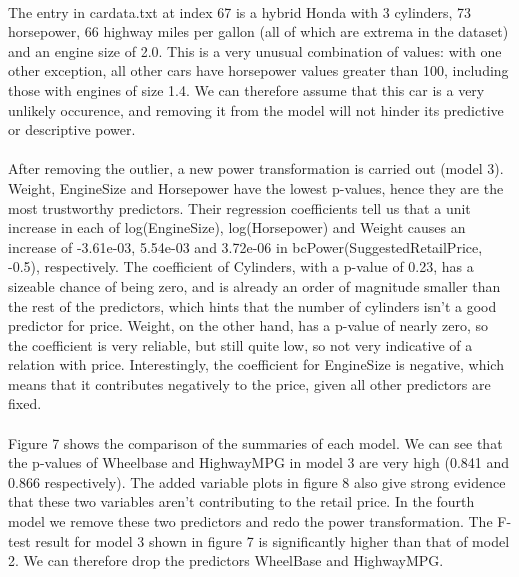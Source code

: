 \documentclass{article}
\begin{document}
\paragraph{}
The entry in cardata.txt at index 67 is a hybrid Honda with 3 cylinders, 73 horsepower, 66 highway miles per gallon (all of which are extrema in the dataset) and an engine size of 2.0. This is a very unusual combination of values: with one other exception, all other cars have horsepower values greater than 100, including those with engines of size 1.4. We can therefore assume that this car is a very unlikely occurence, and removing it from the model will not hinder its predictive or descriptive power.

\paragraph{}
After removing the outlier, a new power transformation is carried out (model 3). Weight, EngineSize and Horsepower have the lowest p-values, hence they are the most trustworthy predictors. Their regression coefficients tell us that a unit increase in each of log(EngineSize), log(Horsepower) and Weight causes an increase of -3.61e-03, 5.54e-03 and 3.72e-06 in bcPower(SuggestedRetailPrice, -0.5), respectively. The coefficient of Cylinders, with a p-value of 0.23, has a sizeable chance of being zero, and is already an order of magnitude smaller than the rest of the predictors, which hints that the number of cylinders isn't a good predictor for price. Weight, on the other hand, has a p-value of nearly zero, so the coefficient is very reliable, but still quite low, so not very indicative of a relation with price. Interestingly, the coefficient for EngineSize is negative, which means that it contributes negatively to the price, given all other predictors are fixed.

\paragraph{}
Figure 7 shows the comparison of the summaries of each model. We can see that the p-values of Wheelbase and HighwayMPG in model 3 are very high (0.841 and 0.866 respectively). The added variable plots in figure 8 also give strong evidence that these two variables aren't contributing to the retail price. In the fourth model we remove these two predictors and redo the power transformation. The F-test result for model 3 shown in figure 7 is significantly higher than that of model 2. We can therefore drop the predictors WheelBase and HighwayMPG.
\end{document}
